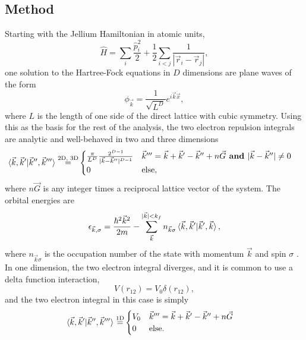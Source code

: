 \documentclass[preprint, journal=prl]{revtex4-1}
\begin{document}
\subsection{Method}
  Starting with the Jellium Hamiltonian in atomic units, 
  \begin{equation}\label{hamiltonian}
   	\hat{H} = \sum_i \frac{\hat{p}_i^2}{2}  + \frac{1}{2} \sum_{i < j} \frac{1}{|\vec{r}_i - 
   	\vec{r}_j|},
  \end{equation}
  one solution to the Hartree-Fock equations in $D$ dimensions are plane waves of the form	
  \begin{equation}\label{planewave}
   	\phi_{\vec{k}} =
    \frac{1} { \sqrt{L ^ D} } e ^ {i \vec{k} \dot \vec{x}},
  \end{equation}
  where $L$ is the length of one side of the direct lattice with cubic symmetry. Using this as the basis for the rest of the analysis, the two electron repulsion integrals are analytic and  well-behaved in two and three dimensions\cite{Delyon2008, Guiliani2005}
  \begin{align}
    \braket{\vec{k}, \vec{k}' | \vec{k}'', \vec{k}'''} 
    \stackrel{ \text{2D, 3D} }{=}&
    \begin{cases} 
      \frac{\pi} {L ^ D} \frac{ 2^{D-1} } { | \vec{k} - \vec{k}'' | ^ {D-1} } 
      & \vec{k}''' = \vec{k} + \vec{k}' - \vec{k}'' + n\vec{G} \textbf{ and } | \vec{k} - 
      \vec{k}''| \neq 0 \\
      0 
      & \text{else},
    \end{cases}
  \end{align}
  where $n\vec{G}$ is any integer times a reciprocal lattice vector of the system. The orbital energies are
  \begin{equation}\label{eq:hf_orb_energy}
    \epsilon_{\vec{k},\sigma}=
    \frac{\hbar^2\vec{k}^2}{2m} - \sum\limits_{\vec{k}}^{|\vec{k}|< 
    k_f}n_{\vec{k}\sigma}\braket{\vec{k}, \vec{k}' |\vec{k}', \vec{k}},
  \end{equation}
  where $n_{\vec{k}\sigma}$ is the occupation number of the state with momentum $\vec{k}$ and spin $\sigma$ \cite{Guiliani2005}. In one dimension, the two electron integral diverges, and it is common to use a delta function interaction, 
  \begin{equation}
    V(r_{12}) = V_0\delta(r_{12}),
  \end{equation}
  and the two electron integral in this case is simply
  \begin{align}
    \braket{\vec{k}, \vec{k}' | \vec{k}'', \vec{k}'''} 
    \stackrel{ \text{1D} }{=}&
    \begin{cases} 
      V_0 
      & \vec{k}''' = \vec{k} + \vec{k}' - \vec{k}'' + n\vec{G}\\
      0 
      & \text{else}.
    \end{cases}
  \end{align}  
    
\end{document}
